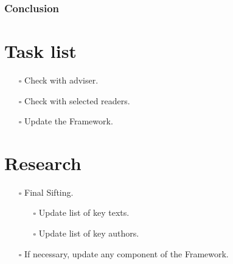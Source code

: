 \documentclass[paper=A4,portrait,twoside=true,twocolumn=true,headinclude=false,footinclude=false,fontsize=10,BCOR=15mm,DIV=13,pagesize=auto,titlepage=firstiscover,mpinclude=true,headings=twolinechapter,open=right,chapterprefix=false,numbers=noendperiod,headsepline=false,parskip=false]{scrbook}
\theoremstyle{definition}
\begin{document}
\subsection{Conclusion}
\label{sec:org09ac90b}
\chapter{Task list}
\label{sec:orga3e8ae3}
\begin{itemize}
\item[{$\square$}] Check with adviser.
\item[{$\square$}] Check with selected readers.
\item[{$\square$}] Update the Framework.
\end{itemize}
\chapter{Research}
\label{sec:org4744676}
\begin{itemize}
\item[{$\square$}] Final Sifting.
\begin{itemize}
\item[{$\square$}] Update list of key texts.
\item[{$\square$}] Update list of key authors.
\end{itemize}
\item[{$\square$}] If necessary, update any component of the Framework.
\end{itemize}
\end{document}
